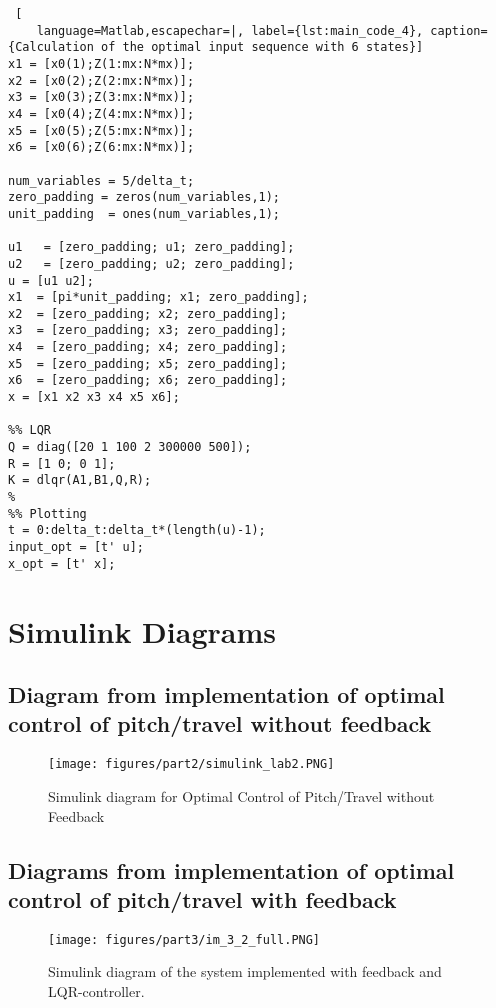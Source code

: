\begin{lstlisting} [
    language=Matlab,escapechar=|, label={lst:main_code_4}, caption={Calculation of the optimal input sequence with 6 states}]
x1 = [x0(1);Z(1:mx:N*mx)];              
x2 = [x0(2);Z(2:mx:N*mx)];              
x3 = [x0(3);Z(3:mx:N*mx)];              
x4 = [x0(4);Z(4:mx:N*mx)];              
x5 = [x0(5);Z(5:mx:N*mx)];              
x6 = [x0(6);Z(6:mx:N*mx)];              

num_variables = 5/delta_t;
zero_padding = zeros(num_variables,1);
unit_padding  = ones(num_variables,1);

u1   = [zero_padding; u1; zero_padding];
u2   = [zero_padding; u2; zero_padding];
u = [u1 u2];
x1  = [pi*unit_padding; x1; zero_padding];
x2  = [zero_padding; x2; zero_padding];
x3  = [zero_padding; x3; zero_padding];
x4  = [zero_padding; x4; zero_padding];
x5  = [zero_padding; x5; zero_padding];
x6  = [zero_padding; x6; zero_padding];
x = [x1 x2 x3 x4 x5 x6];

%% LQR
Q = diag([20 1 100 2 300000 500]);
R = [1 0; 0 1];
K = dlqr(A1,B1,Q,R);      
% 
%% Plotting
t = 0:delta_t:delta_t*(length(u)-1);
input_opt = [t' u]; 
x_opt = [t' x];

\end{lstlisting}



\section{Simulink Diagrams}

\subsection{Diagram from implementation of optimal control of pitch/travel without feedback}

\begin{figure}[!h]
    \centering
	\texttt{[image: figures/part2/simulink\_lab2.PNG]}
	\caption{Simulink diagram for Optimal Control of Pitch/Travel without Feedback}
\label{fig:L2_sim}
\end{figure}

\newpage

\subsection{Diagrams from implementation of optimal control of pitch/travel with feedback}\label{sec:simmulink_3_2}

\begin{figure}[!h]
	\centering
	\texttt{[image: figures/part3/im\_3\_2\_full.PNG]}
	\caption{Simulink diagram of the system implemented with feedback and LQR-controller.}
    \label{fig:3_2_full}
\end{figure} 

